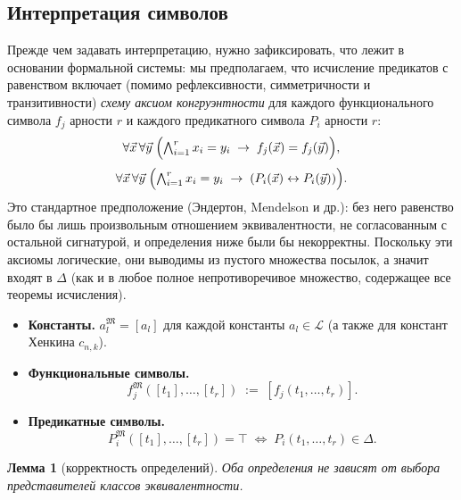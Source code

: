 \documentclass[12pt, a4paper]{article}
\theoremstyle{plain}
\newtheorem{lemma}[theorem]{Лемма}
\theoremstyle{definition}
\newcommand{\Lang}{\mathcal{L}}
\newcommand{\Struct}{\mathfrak{M}}
\begin{document}
\subsection{Интерпретация символов}

Прежде чем задавать интерпретацию, нужно зафиксировать, что лежит
в основании формальной системы: мы предполагаем, что исчисление
предикатов с равенством включает (помимо рефлексивности,
симметричности и транзитивности) \emph{схему аксиом конгруэнтности}
для каждого функционального символа $f_j$ арности $r$ и каждого
предикатного символа $P_i$ арности $r$:
\[
  \forall \vec x\, \forall \vec y\;
  \Bigl(\textstyle\bigwedge_{i=1}^{r} x_i = y_i \;\to\; f_j(\vec x) = f_j(\vec y)\Bigr),
\]
\[
  \forall \vec x\, \forall \vec y\;
  \Bigl(\textstyle\bigwedge_{i=1}^{r} x_i = y_i \;\to\; (P_i(\vec x) \leftrightarrow P_i(\vec y))\Bigr).
\]
Это стандартное предположение (Эндертон, Mendelson и др.): без него
равенство было бы лишь произвольным отношением эквивалентности,
не согласованным с остальной сигнатурой, и определения ниже были бы
некорректны. Поскольку эти аксиомы логические, они выводимы из
пустого множества посылок, а значит входят в $\Delta$ (как и в любое
полное непротиворечивое множество, содержащее все теоремы исчисления).

\begin{itemize}
  \item \textbf{Константы.} $a_l^{\Struct} = [a_l]$ для каждой константы
        $a_l \in \Lang$ (а также для констант Хенкина $c_{n,k}$).

  \item \textbf{Функциональные символы.}
        \[
          f_j^{\Struct}([t_1], \ldots, [t_r]) \;:=\; [f_j(t_1, \ldots, t_r)].
        \]

  \item \textbf{Предикатные символы.}
        \[
          P_i^{\Struct}([t_1], \ldots, [t_r]) = \top
          \;\iff\; P_i(t_1,\ldots,t_r) \in \Delta.
        \]
\end{itemize}

\begin{lemma}[корректность определений]\label{lem:welldefined}
Оба определения не зависят от выбора представителей классов
эквивалентности.
\end{lemma}
\end{document}
